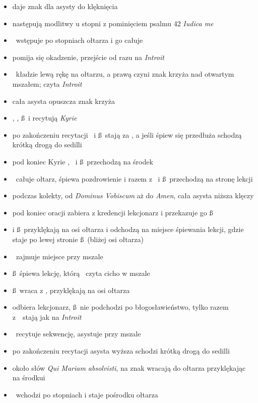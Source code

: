 \begin{itemize}
	\item  {} daje znak dla asysty do klęknięcia
	\item następują modlitwy u stopni z pominięciem psalmu 42 \textit{Iudica me}
	\item \ii~wstępuje po stopniach ołtarza i go całuje
	\item pomija się okadzenie, przejście od razu na \textit{Introit}
	\item \ii~kładzie lewą rękę na ołtarzu, a prawą czyni znak krzyża nad
		otwartym mszałem; czyta \textit{Introit}
	\item cała asysta opuszcza znak krzyża
	\item \ii, \dd, \ss~i  recytują \textit{Kyrie}	
	\item po zakończeniu recytacji \dd~i \ss~stają za \ii, a jeśli śpiew się
		przedłuża schodzą krótką drogą do sedilli
	\item pod koniec Kyrie \ii, \dd~i \ss~przechodzą na środek
	\item \ii~całuje ołtarz, śpiewa pozdrowienie i razem z \dd~i \ss~przechodzą
		na stronę lekcji
	\item podczas kolekty, od \textit{Dominus Vobiscum} aż do
		\textit{Amen}, cała asysta niższa klęczy
	\item pod koniec oracji  zabiera z kredencji lekcjonarz i przekazuje
		go \ss
	\item {} i \ss~przyklękają na osi ołtarza i odchodzą na miejsce śpiewania
		lekcji, gdzie  staje po lewej stronie \ss~(bliżej osi ołtarza)
	\item \dd~zajmuje miejsce przy mszale
	\item \ss~śpiewa lekcję, którą \ii~czyta cicho w mszale
	\item \ss~wraca z , przyklękają na osi ołtarza
	\item {} odbiera lekcjonarz, \ss~nie podchodzi po błogosławieństwo, tylko
		razem z \dd~stają jak na \textit{Introit}
	\item \ii~recytuje sekwencję,  asystuje przy mszale
	\item po zakończeniu recytacji asysta wyższa schodzi krótką drogą do
		sedilli
	\item około słów \textit{Qui Mariam absolvisti}, na znak  wracają do ołtarza
		przyklękając na środkui
	\item \ii~wchodzi po stopniach i staje pośrodku ołtarza
\end{itemize}

